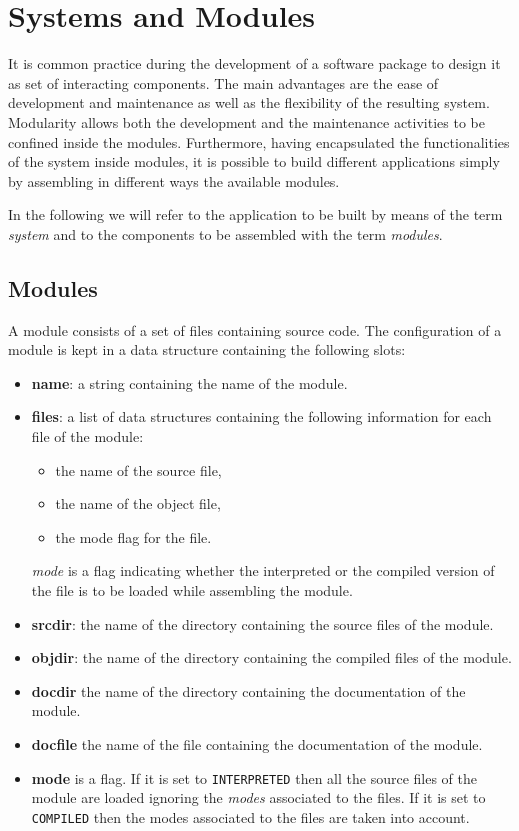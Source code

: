 \section{Systems and Modules}
\label{sysmod}

It is common practice during the development of a software package
to design it as set of interacting components.
The main advantages are the ease of development and maintenance
as well as the flexibility of the resulting system.
Modularity allows both the development and the maintenance activities
to be confined inside the modules.
Furthermore, having encapsulated the functionalities of the system inside
modules, it is possible to build different applications simply by assembling
in different ways the available modules.

In the following we will refer to the application to be built by means
of the term {\it system} and to the components to be assembled
with the term {\it modules}.

\subsection{Modules}

A module consists of a set of files containing source code.
The configuration of a module is kept in a data structure containing the
following slots:

\begin{itemize}
	\item {\bf name}:
		a string containing the name of the module.
	\item {\bf files}:
		a list of data structures containing the following information for each
		file of the module: 
		\begin{itemize}
			\item the name of the source file,
			\item the name of the object file,
			\item the mode flag for the file.
		\end{itemize}
		{\it mode} is a flag indicating whether the interpreted or the compiled
		version of the file is to be loaded while assembling the module.
%
%
	\item {\bf srcdir}:
		the name of the directory containing the source files of the module.
	\item {\bf objdir}:
		the name of the directory containing the compiled files of the module.
	\item {\bf docdir}
		the name of the directory containing the documentation of the module.
	\item {\bf docfile}
		the name of the file containing the documentation of the module.
	\item {\bf mode}
		is a flag. If it is set to {\tt INTERPRETED} then all
		the source files of the module are loaded ignoring the {\em modes}
		associated to the files.
		If it is set to {\tt COMPILED} then the modes associated to the files are
		taken into account.
\end{itemize}

